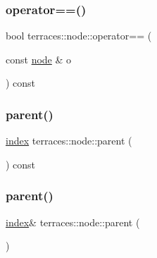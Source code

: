 \subsubsection{\texorpdfstring{operator==()}{operator==()}}
{\footnotesize\ttfamily bool terraces\+::node\+::operator== (\begin{DoxyParamCaption}\item[{const \hyperlink{structterraces_1_1node}{node} \&}]{o }\end{DoxyParamCaption}) const\hspace{0.3cm}{\ttfamily [inline]}}

\mbox{\label{structterraces_1_1node_a0dc3c66ea9c5d75867cf529de3d78598}} 
\subsubsection{\texorpdfstring{parent()}{parent()}\hspace{0.1cm}{\footnotesize\ttfamily [1/2]}}
{\footnotesize\ttfamily \hyperlink{namespaceterraces_adbc33ccb543d1634e96d0eb02e472c77}{index} terraces\+::node\+::parent (\begin{DoxyParamCaption}{ }\end{DoxyParamCaption}) const\hspace{0.3cm}{\ttfamily [inline]}}

\mbox{\label{structterraces_1_1node_a702158876a59ff469fa1e1fd5a5bca45}} 
\subsubsection{\texorpdfstring{parent()}{parent()}\hspace{0.1cm}{\footnotesize\ttfamily [2/2]}}
{\footnotesize\ttfamily \hyperlink{namespaceterraces_adbc33ccb543d1634e96d0eb02e472c77}{index}\& terraces\+::node\+::parent (\begin{DoxyParamCaption}{ }\end{DoxyParamCaption})\hspace{0.3cm}{\ttfamily [inline]}}

\mbox{\label{structterraces_1_1node_ab6022c07498a4b1cb9e737fa0ffe4278}} 
